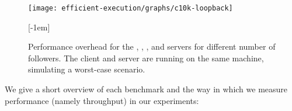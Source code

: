 

\begin{figure}[!t]
 \centering
 \texttt{[image: efficient-execution/graphs/c10k-loopback]}
 \caption{Performance overhead for the \beanstalkd, \lighttpd, \memcached, \nginx
   and \redis servers for different number of followers.  The client
   and server are running on the same machine, simulating a worst-case scenario.}
   \label{fig:servers}[-1em]
\end{figure}


We give a short overview of each benchmark and the way in which we
measure performance (namely throughput) in our experiments:

